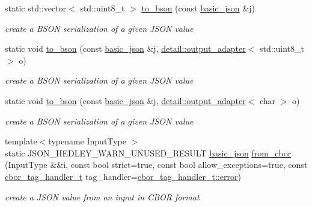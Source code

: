 \begin{DoxyCompactItemize}
static std\+::vector$<$ std\+::uint8\+\_\+t $>$ \hyperlink{classnlohmann_1_1basic__json_a5b6a88593477b89119025da589cc47a9}{to\+\_\+bson} (const \hyperlink{classnlohmann_1_1basic__json}{basic\+\_\+json} \&j)
\begin{DoxyCompactList}\small\item\em create a B\+S\+ON serialization of a given J\+S\+ON value \end{DoxyCompactList}\item 
static void \hyperlink{classnlohmann_1_1basic__json_a4a9babd6635e3f7d4af3dec0635073c5}{to\+\_\+bson} (const \hyperlink{classnlohmann_1_1basic__json}{basic\+\_\+json} \&j, \hyperlink{classnlohmann_1_1detail_1_1output__adapter}{detail\+::output\+\_\+adapter}$<$ std\+::uint8\+\_\+t $>$ o)
\begin{DoxyCompactList}\small\item\em create a B\+S\+ON serialization of a given J\+S\+ON value \end{DoxyCompactList}\item 
static void \hyperlink{classnlohmann_1_1basic__json_a9ebed178fb7dad1a574bcb7c361fb1b8}{to\+\_\+bson} (const \hyperlink{classnlohmann_1_1basic__json}{basic\+\_\+json} \&j, \hyperlink{classnlohmann_1_1detail_1_1output__adapter}{detail\+::output\+\_\+adapter}$<$ char $>$ o)
\begin{DoxyCompactList}\small\item\em create a B\+S\+ON serialization of a given J\+S\+ON value \end{DoxyCompactList}\item 
{\footnotesize template$<$typename Input\+Type $>$ }\\static J\+S\+O\+N\+\_\+\+H\+E\+D\+L\+E\+Y\+\_\+\+W\+A\+R\+N\+\_\+\+U\+N\+U\+S\+E\+D\+\_\+\+R\+E\+S\+U\+LT \hyperlink{classnlohmann_1_1basic__json}{basic\+\_\+json} \hyperlink{classnlohmann_1_1basic__json_a44dd5635fb2da4710f6cd6e42b72773f}{from\+\_\+cbor} (Input\+Type \&\&i, const bool strict=true, const bool allow\+\_\+exceptions=true, const \hyperlink{namespacenlohmann_1_1detail_a58bb1ef1a9ad287a9cfaf1855784d9ac}{cbor\+\_\+tag\+\_\+handler\+\_\+t} tag\+\_\+handler=\hyperlink{namespacenlohmann_1_1detail_a58bb1ef1a9ad287a9cfaf1855784d9acacb5e100e5a9a3e7f6d1fd97512215282}{cbor\+\_\+tag\+\_\+handler\+\_\+t\+::error})
\begin{DoxyCompactList}\small\item\em create a J\+S\+ON value from an input in C\+B\+OR format \end{DoxyCompactList}\item 

\end{DoxyCompactItemize}
